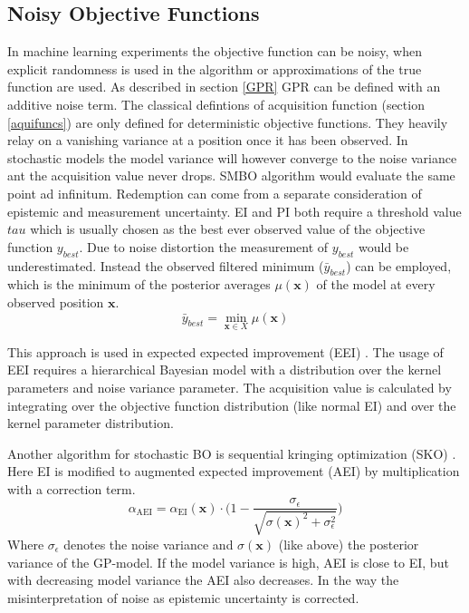 \documentclass[english]{article}
\newcommand{\EI}{\operatorname{EI}}
\newcommand{\x}{\mathbf{x}}
\begin{document}
\subsection{Noisy Objective Functions}
In machine learning experiments the objective function can be noisy, when explicit randomness is used in the algorithm or approximations of the true function are used. As described in section \ref{GPR} GPR can be defined with an additive noise term. The classical defintions of acquisition function (section \ref{aquifuncs}) are only defined for deterministic objective functions. They heavily relay on a vanishing variance at a position once it has been observed.  In stochastic models the model variance will however converge to the noise variance ant the acquisition value never drops. SMBO algorithm would evaluate the same point ad infinitum. Redemption can come from a separate consideration of epistemic and measurement uncertainty.
EI and PI both require a threshold value $tau$ which is usually chosen as the best ever observed value of the objective function $y_{best}$. Due to noise distortion the measurement of $y_{best}$ would be underestimated.  Instead the observed filtered minimum ($\bar{y}_{best}$) can be employed, which is the minimum of the posterior averages $\mu(\x)$ of the model at every observed position $\x$.
\begin{equation}
  \bar{y}_{best} = \min_{\x \in X} \mu(\x)
\end{equation}

This approach is used in expected expected improvement (EEI) \cite{pandita_extending_2016}. The usage of EEI requires a hierarchical Bayesian model with a distribution over the kernel parameters and noise variance parameter. The acquisition value is calculated by integrating over the objective function distribution (like normal EI) and over the kernel parameter distribution.

Another algorithm for stochastic BO is sequential kringing optimization (SKO) \cite{huang_global_2006}. Here EI is modified to augmented expected improvement (AEI) by multiplication with a correction term.
\begin{equation}
  \alpha_{\operatorname{AEI}} = \alpha_{\EI}(\x) \cdot \bigg(1 - \frac{\sigma_\epsilon}{\sqrt{\sigma(\x)^2 + \sigma_\epsilon^2}}\bigg)
\end{equation}
Where $\sigma_\epsilon$ denotes the noise variance and $\sigma(\x)$ (like above) the posterior variance of the GP-model. If the model variance is high, AEI is close to EI, but with decreasing model variance the AEI also decreases. In the way the misinterpretation of noise as epistemic uncertainty is corrected.
\end{document}
